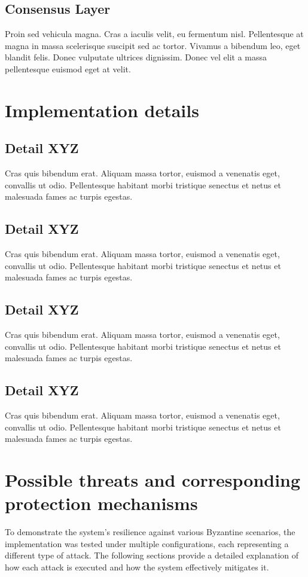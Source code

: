 \documentclass[runningheads]{llncs}
\begin{document}
\subsection{Consensus Layer}
Proin sed vehicula magna. Cras a iaculis velit, eu fermentum nisl. Pellentesque
at magna in massa scelerisque suscipit sed ac tortor. Vivamus a bibendum leo,
eget blandit felis. Donec vulputate ultrices dignissim. Donec vel elit a massa
pellentesque euismod eget at velit.
%
\section{Implementation details}
\subsection{Detail XYZ}
Cras quis bibendum erat. Aliquam massa tortor, euismod a venenatis eget,
convallis ut odio. Pellentesque habitant morbi tristique senectus et netus et
malesuada fames ac turpis egestas.
%
\subsection{Detail XYZ}
Cras quis bibendum erat. Aliquam massa tortor, euismod a venenatis eget,
convallis ut odio. Pellentesque habitant morbi tristique senectus et netus et
malesuada fames ac turpis egestas.
%
\subsection{Detail XYZ}
Cras quis bibendum erat. Aliquam massa tortor, euismod a venenatis eget,
convallis ut odio. Pellentesque habitant morbi tristique senectus et netus et
malesuada fames ac turpis egestas.
%
\subsection{Detail XYZ}
Cras quis bibendum erat. Aliquam massa tortor, euismod a venenatis eget,
convallis ut odio. Pellentesque habitant morbi tristique senectus et netus et
malesuada fames ac turpis egestas.
%
\section{Possible threats and corresponding protection mechanisms} To
demonstrate the system's resilience against various Byzantine scenarios, the
implementation was tested under multiple configurations, each representing a
different type of attack. The following sections provide a detailed explanation
of how each attack is executed and how the system effectively mitigates it.
\end{document}
